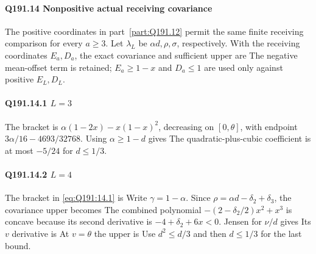 \paragraph{Q191.14 Nonpositive actual receiving covariance}\label{part:Q191.14}
The positive coordinates in part~\ref{part:Q191.12} permit the same finite
receiving comparison for every $a\ge\allowbreak 3$. Let $\lambda_L$ be
$\alpha d,\allowbreak \rho,\allowbreak \sigma$, respectively. With the receiving coordinates
$E_a,\allowbreak D_a$, the exact covariance and sufficient upper are
The negative mean-offset term is retained; $E_a\ge\allowbreak 1-x$ and $D_a\le\allowbreak 1$
are used only against positive $E_L,\allowbreak D_L$.

\paragraph{Q191.14.1 $L=\allowbreak 3$}
The bracket is $\alpha(1-2x)-x(1-x)^2$, decreasing on $[0,\allowbreak \theta]$,
with endpoint $3\alpha/16-4693/32768$. Using $\alpha\ge\allowbreak 1-d$ gives
The quadratic-plus-cubic coefficient is at most $-5/24$ for $d\le\allowbreak 1/3$.

\paragraph{Q191.14.2 $L=\allowbreak 4$}
The bracket in \eqref{eq:Q191:14.1} is
Write $\gamma=\allowbreak 1-\alpha$. Since $\rho=\allowbreak \alpha d-\delta_2+\delta_3$,
the covariance upper becomes
The combined polynomial $-(2-\delta_2/2)x^2+x^3$ is concave because
its second derivative is $-4+\delta_2+6x<\allowbreak 0$. Jensen for $\nu/d$ gives
Its $v$ derivative is
At $v=\allowbreak \theta$ the upper is
Use $d^2\le\allowbreak  d/3$ and then $d\le\allowbreak 1/3$ for the last bound.

